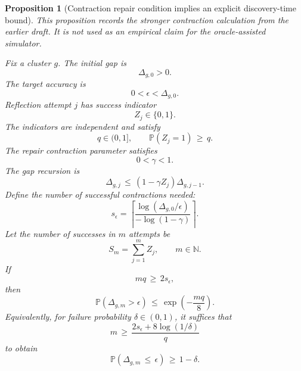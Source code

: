 \documentclass{article} %
\newtheorem{proposition}[theorem]{Proposition}
\begin{document}
\begin{proposition}[Contraction repair condition implies an explicit discovery-time bound]
\label{prop:14}
This proposition records the stronger contraction calculation from the earlier
draft. It is not used as an empirical claim for the oracle-assisted simulator.

Fix a cluster \(g\).  The initial gap is
\begin{equation}
\label{eq:app-fifth-contract-gap0}
\Delta_{g,0}>0.
\end{equation}
The target accuracy is
\begin{equation}
\label{eq:app-fifth-contract-eps}
0<\epsilon<\Delta_{g,0}.
\end{equation}
Reflection attempt \(j\) has success indicator
\begin{equation}
\label{eq:app-fifth-contract-Z}
Z_j\in\{0,1\}.
\end{equation}
The indicators are independent and satisfy
\begin{equation}
\label{eq:app-fifth-contract-q}
q\in(0,1],
\qquad
\mathbb{P}(Z_j=1)\,\ge\, q.
\end{equation}
The repair contraction parameter satisfies
\begin{equation}
\label{eq:app-fifth-contract-gamma}
0<\gamma<1.
\end{equation}
The gap recursion is
\begin{equation}
\label{eq:app-fifth-contract-recursion}
\Delta_{g,j}
\,\le\,
(1-\gamma Z_j)\Delta_{g,j-1}.
\end{equation}
Define the number of successful contractions needed:
\begin{equation}
\label{eq:app-fifth-contract-s}
s_\epsilon
=
\left\lceil
\frac{\log(\Delta_{g,0}/\epsilon)}
{-\log(1-\gamma)}
\right\rceil.
\end{equation}
Let the number of successes in \(m\) attempts be
\begin{equation}
\label{eq:app-fifth-contract-Sm}
S_m
=
\sum_{j=1}^{m}Z_j,
\qquad
m\in\mathbb N.
\end{equation}
If
\begin{equation}
\label{eq:app-fifth-contract-mq}
mq\,\ge\, 2s_\epsilon,
\end{equation}
then
\begin{equation}
\label{eq:app-fifth-contract-tail}
\mathbb{P}(\Delta_{g,m}>\epsilon)
\,\le\,
\exp\!\left(-\frac{mq}{8}\right).
\end{equation}
Equivalently, for failure probability \(\delta\in(0,1)\), it suffices that
\begin{equation}
\label{eq:app-fifth-contract-m-delta}
m
\,\ge\,
\frac{2s_\epsilon+8\log(1/\delta)}{q}
\end{equation}
to obtain
\begin{equation}
\label{eq:app-fifth-contract-prob}
\mathbb{P}(\Delta_{g,m}\,\le\, \epsilon)
\,\ge\,
1-\delta.
\end{equation}
\end{proposition}
\end{document}
